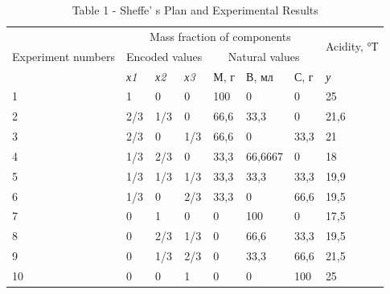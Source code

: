\begin{table}[H]
\caption*{Table 1 - Sheffe' s Plan and Experimental Results}
\centering
\begin{tabular}{|l|llllll|l|}
\hline
\multirow{3}{*}{Experiment numbers} &
  \multicolumn{6}{c|}{Mass fraction of components} &
  \multirow{2}{*}{Acidity, °Т} \\ \cline{2-7}
 &
  \multicolumn{3}{c|}{Encoded values} &
  \multicolumn{3}{c|}{Natural values} &
   \\ \cline{2-8} 
 &
  \multicolumn{1}{l|}{\textit{х1}} &
  \multicolumn{1}{l|}{\textit{х2}} &
  \multicolumn{1}{l|}{\textit{х3}} &
  \multicolumn{1}{l|}{М, г} &
  \multicolumn{1}{l|}{В, мл} &
  С, г &
  \textit{у} \\ \hline
1 &
  \multicolumn{1}{l|}{1} &
  \multicolumn{1}{l|}{0} &
  \multicolumn{1}{l|}{0} &
  \multicolumn{1}{l|}{100} &
  \multicolumn{1}{l|}{0} &
  0 &
  25 \\ \hline
2 &
  \multicolumn{1}{l|}{2/3} &
  \multicolumn{1}{l|}{1/3} &
  \multicolumn{1}{l|}{0} &
  \multicolumn{1}{l|}{66,6} &
  \multicolumn{1}{l|}{33,3} &
  0 &
  21,6 \\ \hline
3 &
  \multicolumn{1}{l|}{2/3} &
  \multicolumn{1}{l|}{0} &
  \multicolumn{1}{l|}{1/3} &
  \multicolumn{1}{l|}{66,6} &
  \multicolumn{1}{l|}{0} &
  33,3 &
  21 \\ \hline
4 &
  \multicolumn{1}{l|}{1/3} &
  \multicolumn{1}{l|}{2/3} &
  \multicolumn{1}{l|}{0} &
  \multicolumn{1}{l|}{33,3} &
  \multicolumn{1}{l|}{66,6667} &
  0 &
  18 \\ \hline
5 &
  \multicolumn{1}{l|}{1/3} &
  \multicolumn{1}{l|}{1/3} &
  \multicolumn{1}{l|}{1/3} &
  \multicolumn{1}{l|}{33,3} &
  \multicolumn{1}{l|}{33,3} &
  33,3 &
  19,9 \\ \hline
6 &
  \multicolumn{1}{l|}{1/3} &
  \multicolumn{1}{l|}{0} &
  \multicolumn{1}{l|}{2/3} &
  \multicolumn{1}{l|}{33,3} &
  \multicolumn{1}{l|}{0} &
  66,6 &
  19,5 \\ \hline
7 &
  \multicolumn{1}{l|}{0} &
  \multicolumn{1}{l|}{1} &
  \multicolumn{1}{l|}{0} &
  \multicolumn{1}{l|}{0} &
  \multicolumn{1}{l|}{100} &
  0 &
  17,5 \\ \hline
8 &
  \multicolumn{1}{l|}{0} &
  \multicolumn{1}{l|}{2/3} &
  \multicolumn{1}{l|}{1/3} &
  \multicolumn{1}{l|}{0} &
  \multicolumn{1}{l|}{66,6} &
  33,3 &
  19,5 \\ \hline
9 &
  \multicolumn{1}{l|}{0} &
  \multicolumn{1}{l|}{1/3} &
  \multicolumn{1}{l|}{2/3} &
  \multicolumn{1}{l|}{0} &
  \multicolumn{1}{l|}{33,3} &
  66,6 &
  21,5 \\ \hline
10 &
  \multicolumn{1}{l|}{0} &
  \multicolumn{1}{l|}{0} &
  \multicolumn{1}{l|}{1} &
  \multicolumn{1}{l|}{0} &
  \multicolumn{1}{l|}{0} &
  100 &
  25 \\ \hline
\end{tabular}
\end{table}

